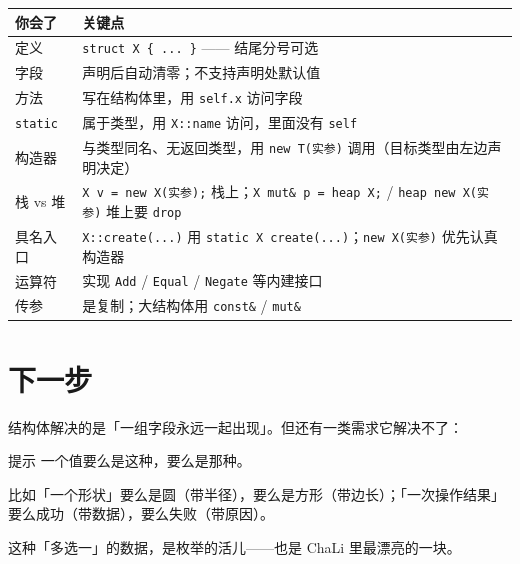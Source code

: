 {\small\setlength{\tabcolsep}{4pt}
\begin{longtable}{>{\raggedright\arraybackslash}p{}>{\raggedright\arraybackslash}p{}}
\toprule
你会了 & 关键点 \\
\midrule
\endhead
定义 & \texttt{struct X \{ .\allowbreak{}.\allowbreak{}.\allowbreak{} \}} —— 结尾分号可选 \\
字段 & 声明后自动清零；不支持声明处默认值 \\
方法 & 写在结构体里，用 \texttt{self.\allowbreak{}x} 访问字段 \\
\texttt{static} & 属于类型，用 \texttt{X:\allowbreak{}:\allowbreak{}name} 访问，里面没有 \texttt{self} \\
构造器 & 与类型同名、无返回类型，用 \texttt{new T(\allowbreak{}实参)\allowbreak{}} 调用（目标类型由左边声明决定） \\
栈 vs 堆 & \texttt{X v =\allowbreak{} new X(\allowbreak{}实参)\allowbreak{};} 栈上；\texttt{X mut\& p =\allowbreak{} heap X;} / \texttt{heap new X(\allowbreak{}实参)\allowbreak{}} 堆上要 \texttt{drop} \\
具名入口 & \texttt{X:\allowbreak{}:\allowbreak{}create(\allowbreak{}.\allowbreak{}.\allowbreak{}.\allowbreak{})\allowbreak{}} 用 \texttt{static X create(\allowbreak{}.\allowbreak{}.\allowbreak{}.\allowbreak{})\allowbreak{}}；\texttt{new X(\allowbreak{}实参)\allowbreak{}} 优先认真构造器 \\
运算符 & 实现 \texttt{Add} / \texttt{Equal} / \texttt{Negate} 等内建接口 \\
传参 & 是复制；大结构体用 \texttt{const\&} / \texttt{mut\&} \\
\bottomrule
\end{longtable}
}

\section{下一步}

结构体解决的是「一组字段永远一起出现」。但还有一类需求它解决不了：

\begin{tip}{提示}
一个值要么是这种，要么是那种。
\end{tip}

比如「一个形状」要么是圆（带半径），要么是方形（带边长）；「一次操作结果」要么成功（带数据），要么失败（带原因）。

这种「多选一」的数据，是枚举的活儿——也是 ChaLi 里最漂亮的一块。

